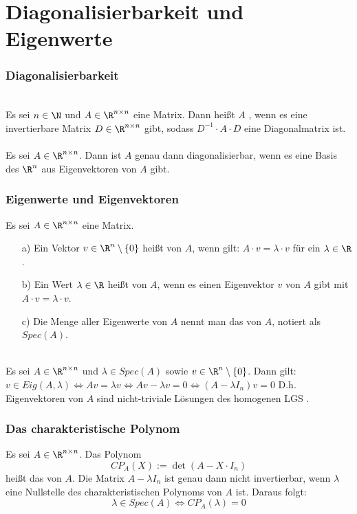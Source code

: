 \section{Diagonalisierbarkeit und Eigenwerte}
%
\begin{frame}\frametitle{Diagonalisierbarkeit}
\\
Es sei $n \in \N$ und $A \in \R^{n\times n}$ eine Matrix. Dann heißt $A$ , wenn es eine invertierbare Matrix $D \in \R^{n\times n}$ gibt, sodass $D^{-1}\cdot A \cdot D$ eine Diagonalmatrix ist.\\\vfill
{}\\
Es sei $A \in \R^{n\times n}$. Dann ist $A$ genau dann diagonalisierbar, wenn es eine Basis des $\R^n$ aus Eigenvektoren von $A$ gibt.\\

\end{frame}
%
%
\begin{frame}\frametitle{Eigenwerte und Eigenvektoren}
Es sei $A\in\R^{n\times n}$ eine Matrix. \pause \vfill
\begin{itemize}
\item[a)] Ein Vektor $v \in \R^n\setminus \{0\}$ heißt  von $A$, wenn gilt: $A\cdot v = \lambda \cdot v$ für ein $\lambda \in \R$. \vfill
\item[b)] Ein Wert $\lambda \in \R$ heißt  von $A$, wenn es einen Eigenvektor $v$ von $A$ gibt mit $A\cdot v = \lambda\cdot v$. \vfill
\item[c)] Die Menge aller Eigenwerte von $A$ nennt man das  von $A$, notiert als $Spec(A)$.
\end{itemize}\vfill\pause
{}\\
Es sei $A\in \R^{n\times n}$ und $\lambda \in Spec(A)$ sowie $v \in \R^n\setminus \{0\}$. Dann gilt:\\\vfill 
$
v \in Eig(A,\lambda) \Longleftrightarrow Av=\lambda v  \Longleftrightarrow Av-\lambda v=0 \Longleftrightarrow (A-\lambda I_n)v=0
$
\vfill
D.h. Eigenvektoren von $A$ sind nicht-triviale Lösungen des homogenen LGS .\\
\end{frame}
%
%
\begin{frame}\frametitle{Das charakteristische Polynom}
Es sei $A \in \R^{n\times n}$. Das Polynom
$$
CP_A(X):=\det(A-X\cdot I_n)
$$
heißt das  von $A$.
\vfill 
Die Matrix $A-\lambda I_n$ ist genau dann nicht invertierbar, wenn $\lambda$ eine Nullstelle des charakteristischen Polynoms von $A$ ist. Daraus folgt:
$$
\lambda \in Spec(A) \Longleftrightarrow CP_A(\lambda)=0
$$
\end{frame}
